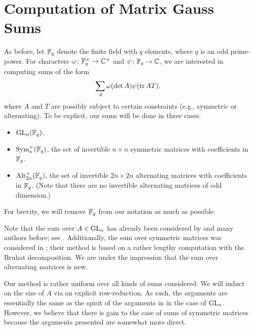 
\section{Computation of Matrix Gauss Sums} \label{sec:gsum}
As before, let $\mathbb F_q$ denote the finite field with $q$ elements, where $q$ is an odd prime-power. For characters $\omega\colon\mathbb F_q^\times\to\mathbb C^\times$ and $\psi\colon\mathbb F_q\to\mathbb C$, we are interested in computing sums of the form
\[\sum_A\omega(\det A)\psi(\operatorname{tr} AT),\]
where $A$ and $T$ are possibly subject to certain constraints (e.g., symmetric or alternating). To be explicit, our sums will be done in three cases.
\begin{itemize}
    \item $\mathrm{GL}_n(\mathbb F_q)$.
    \item $\operatorname{Sym}_n^\times(\mathbb F_q)$, the set of invertible $n\times n$ symmetric matrices with coefficients in $\mathbb F_q$.
    \item $\operatorname{Alt}_{2n}^\times(\mathbb F_q)$, the set of invertible $2n\times 2n$ alternating matrices with coefficients in $\mathbb F_q$. (Note that there are no invertible alternating matrices of odd dimension.)
\end{itemize}
For brevity, we will remove $\mathbb F_q$ from our notation as much as possible.

Note that the sum over $A\in\mathrm{GL}_n$ has already been considered by \cite{kim-gauss-sum} and many authors before; see \cite[Section 1]{kim-gauss-sum}. Additionally, the sum over symmetric matrices was considered in \cite{saito-sym-gauss-sum}; their method is based on a rather lengthy computation with the Bruhat decomposition. We are under the impression that the sum over alternating matrices is new.

Our method is rather uniform over all kinds of sums considered. We will induct on the size of $A$ via an explicit row-reduction. As such, the arguments are essentially the same as the spirit of the arguments in \cite{kim-gauss-sum} in the case of $\mathrm{GL}_n$. However, we believe that there is gain to the case of sums of symmetric matrices because the arguments presented are somewhat more direct.


